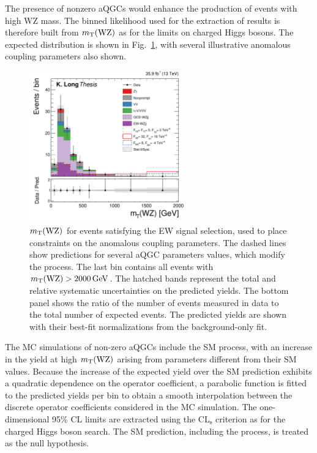 The presence of nonzero aQGCs would enhance the production of events with high 
WZ mass. The binned likelihood used for the extraction of results
is therefore built from $m_{\mathrm{T}}(\mathrm{W}\mathrm{Z})$ as for the limits on charged Higgs bosons. The 
expected distribution is shown in Fig.~\ref{fig:aQGCDistributionExp}, 
with several illustrative anomalous coupling parameters also shown.

\begin{figure}[htbp]
  \centering
    \includegraphics[width=0.6\textwidth]{figures/AnalysisProcedure/MTWZ_aQGC_expected.pdf}
  \caption{
      $m_{\mathrm{T}}(\mathrm{W}\mathrm{Z})$ for events satisfying the EW signal selection,
      used to place constraints on the anomalous coupling parameters.
      The dashed lines show predictions for several aQGC parameters values, which modify the \EWWZ process.
      The last bin contains all events with $m_{\mathrm{T}}(\mathrm{W}\mathrm{Z}) > 2000\,\text{Ge\hspace{-.08em}V}$.
      The hatched bands represent the total and relative 
      systematic uncertainties on the predicted yields.
      The bottom panel shows the ratio of the number of events measured in data to the total 
      number of expected events. 
      The predicted yields are shown with their best-fit normalizations from the background-only fit.
      }
 \label{fig:aQGCDistributionExp}
\end{figure}

The MC simulations of non-zero aQGCs include the SM \EWWZ process, with an increase
in the yield at high $m_{\mathrm{T}}(\mathrm{W}\mathrm{Z})$ arising from parameters different from their SM values. 
Because the increase of the expected yield over the SM prediction exhibits a quadratic 
dependence on the operator coefficient, 
a parabolic function is fitted to the predicted yields per bin to obtain a smooth interpolation
between the discrete operator coefficients considered in the MC simulation.
The one-dimensional 95\% CL limits are extracted 
using the CL$\mathrm{_s}$ criterion
as for the charged Higgs boson search.
The SM prediction, including the \EWWZ process, is treated as the null hypothesis.

